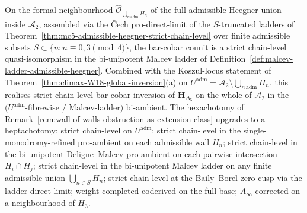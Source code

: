 \begin{corollary}
\label{cor:global-strict-admissible-heegner}
\ClaimStatusConditional
{}%
On the formal neighbourhood
$\widehat{\mathcal{O}}_{\bigcup_{n\,\mathrm{adm}}H_n}$ of the full
admissible Heegner union inside $\overline{\mathcal{A}_2}$, assembled
via the \v Cech pro-direct-limit of the $S$-truncated ladders of
Theorem~\textup{\ref{thm:mc5-admissible-heegner-strict-chain-level}}
over finite admissible subsets $S\subset\{n:n\equiv 0,3\pmod 4\}$, the
bar-cobar counit is a strict chain-level quasi-isomorphism in the
bi-unipotent Malcev ladder of
Definition~\textup{\ref{def:malcev-ladder-admissible-heegner}}.
Combined with the Koszul-locus statement of
Theorem~\textup{\ref{thm:climax-W18-global-inversion}}(a) on
$U^{\mathrm{adm}}=\overline{\mathcal{A}_2}\setminus\bigcup_{n\,\mathrm{adm}}H_n$,
this realises strict chain-level bar-cobar inversion of
$\mathbf H_{\Delta_5}$ on the whole of $\overline{\mathcal{A}_2}$ in
the $(U^{\mathrm{adm}}$-fibrewise $/$ Malcev-ladder$)$ bi-ambient. The
hexachotomy of
Remark~\textup{\ref{rem:wall-of-walls-obstruction-as-extension-class}}
upgrades to a heptachotomy: strict chain-level on $U^{\mathrm{adm}}$;
strict chain-level in the single-monodromy-refined pro-ambient on each
admissible wall $H_n$; strict chain-level in the bi-unipotent
Deligne--Malcev pro-ambient on each pairwise intersection
$H_i\cap H_j$; strict chain-level in the bi-unipotent Malcev ladder
on any finite admissible union $\bigcup_{n\in S}H_n$; strict
chain-level at the Baily--Borel zero-cusp via the ladder direct
limit; weight-completed coderived on the full base;
$A_\infty$-corrected on a neighbourhood of $H_3$.
\end{corollary}

